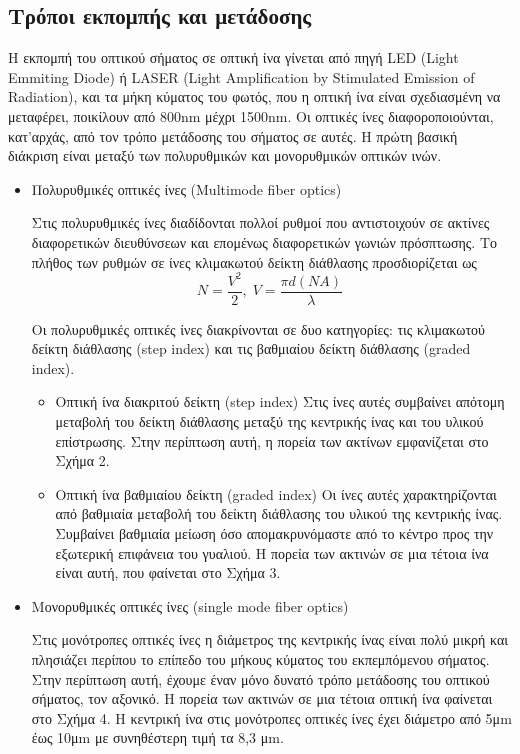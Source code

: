 \documentclass[a4paper,11pt,titlepage]{article}
\begin{document}
\subsection{Τρόποι εκπομπής και μετάδοσης}
Η εκπομπή του οπτικού σήματος σε οπτική ίνα γίνεται από πηγή LED (Light Emmiting Diode) ή LASER (Light Amplification by Stimulated Emission of Radiation), και τα μήκη κύματος του φωτός, που η οπτική ίνα είναι σχεδιασμένη να μεταφέρει, ποικίλουν από 800nm μέχρι 1500nm. Οι οπτικές ίνες διαφοροποιούνται, κατ'αρχάς, από τον τρόπο μετάδοσης του σήματος σε αυτές. Η πρώτη βασική διάκριση είναι μεταξύ των πολυρυθμικών και μονορυθμικών οπτικών ινών.
\begin{itemize}

\item Πολυρυθμικές οπτικές ίνες (Multimode fiber optics)

Στις πολυρυθμικές ίνες διαδίδονται πολλοί ρυθμοί που αντιστοιχούν σε ακτίνες διαφορετικών διευθύνσεων και επομένως διαφορετικών γωνιών πρόσπτωσης. Το πλήθος των ρυθμών σε ίνες κλιμακωτού δείκτη διάθλασης προσδιορίζεται ως 
\begin{equation}
N = \frac{V^2}{2} , \; V = \frac{{\pi}d(NA)}{\lambda} \;
\end{equation}

Οι πολυρυθμικές οπτικές ίνες διακρίνονται σε δυο κατηγορίες: τις κλιμακωτού δείκτη διάθλασης (step index) και τις βαθμιαίου δείκτη διάθλασης (graded index).
\begin{itemize}

\item Οπτική ίνα διακριτού δείκτη (step index)
Στις ίνες αυτές συμβαίνει απότομη μεταβολή του δείκτη διάθλασης μεταξύ της κεντρικής ίνας και του υλικού επίστρωσης. Στην περίπτωση αυτή, η πορεία των ακτίνων εμφανίζεται στο Σχήμα 2.

\item Οπτική ίνα βαθμιαίου δείκτη (graded index)
Οι ίνες αυτές χαρακτηρίζονται από βαθμιαία μεταβολή του δείκτη διάθλασης του υλικού της κεντρικής ίνας. Συμβαίνει βαθμιαία μείωση όσο απομακρυνόμαστε από το κέντρο προς την εξωτερική επιφάνεια του γυαλιού. Η πορεία των ακτινών σε μια τέτοια ίνα είναι αυτή, που φαίνεται στο Σχήμα 3.
\end{itemize}

\item Μονορυθμικές οπτικές ίνες (single mode fiber optics)

Στις μονότροπες οπτικές ίνες η διάμετρος της κεντρικής ίνας είναι πολύ μικρή και πλησιάζει περίπου το επίπεδο του μήκους κύματος του εκπεμπόμενου σήματος. Στην περίπτωση αυτή, έχουμε έναν μόνο δυνατό τρόπο μετάδοσης του οπτικού σήματος, τον αξονικό. Η πορεία των ακτινών σε μια τέτοια οπτική ίνα φαίνεται στο Σχήμα 4. Η κεντρική ίνα στις μονότροπες οπτικές ίνες έχει διάμετρο από 5μm έως 10μm με συνηθέστερη τιμή τα 8,3 μm.
\end{itemize}
\end{document}
